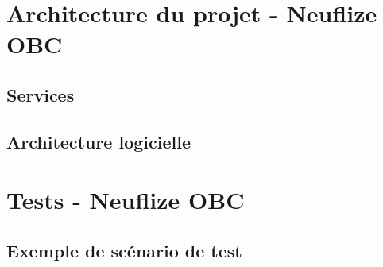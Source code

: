 \documentclass[11pt,twoside]{scrreprt}
\begin{document}
\begin{appendices}

	\chapter{Architecture du projet - Neuflize OBC}
	
		\section{Services}
		\label{a1}
		
	
		\section{Architecture logicielle}
		\label{a2}
		
	
	\chapter{Tests - Neuflize OBC}
		\section{Exemple de scénario de test}
		\label{b1}
		
	
\end{appendices}
\newpage
\newpage
\end{document}
